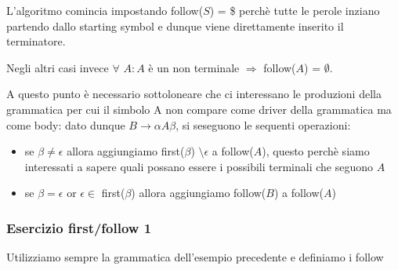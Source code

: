 \documentclass[class=book, crop=false, oneside, 12pt]{standalone}
\begin{document}
L'algoritmo comincia impostando follow(\(S\)) = \$ perchè tutte le perole inziano partendo dallo starting symbol e dunque viene direttamente inserito il terminatore. %

Negli altri casi invece \(\forall\) \(A : A\) è un non terminale \(\Rightarrow\) follow(\(A\)) = \(\emptyset\).

A questo punto è necessario sottoloneare che ci interessano le produzioni della grammatica per cui il simbolo A non compare come driver della grammatica ma come body: dato dunque \(B \rightarrow \alpha A \beta\), si seseguono le sequenti operazioni: 

\begin{itemize}
    \item se \(\beta \neq \epsilon\) allora aggiungiamo first(\(\beta\)) \(\setminus \epsilon\) a follow(\(A\)), questo perchè siamo interessati a sapere quali possano essere i possibili terminali che seguono \(A\)
    \item se \(\beta = \epsilon\) or \(\epsilon \in\) first(\(\beta\)) allora aggiungiamo follow(\(B\)) a follow(\(A\)) %
\end{itemize}


\subsubsection{Esercizio first/follow 1}

Utilizziamo sempre la grammatica dell'esempio precedente e definiamo i follow
\end{document}
